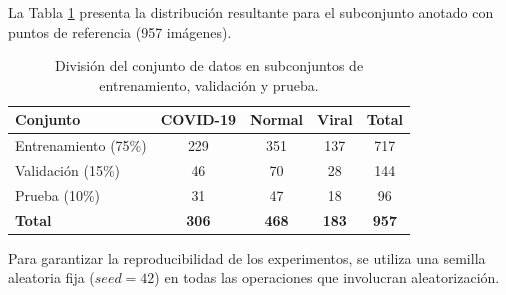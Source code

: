 La Tabla \ref{tab:division_splits} presenta la distribución resultante para el subconjunto anotado con puntos de referencia (957 imágenes).

\begin{table}[htbp]
    \centering
    \caption{División del conjunto de datos en subconjuntos de entrenamiento, validación y prueba.}
    \label{tab:division_splits}
    \small
    \begin{tabular}{@{}lcccc@{}}
        \toprule
        \textbf{Conjunto} & \textbf{COVID-19} & \textbf{Normal} & \textbf{Viral} & \textbf{Total} \\
        \midrule
        Entrenamiento (75\%) & 229 & 351 & 137 & 717 \\
        Validación (15\%) & 46 & 70 & 28 & 144 \\
        Prueba (10\%) & 31 & 47 & 18 & 96 \\
        \midrule
        \textbf{Total} & \textbf{306} & \textbf{468} & \textbf{183} & \textbf{957} \\
        \bottomrule
    \end{tabular}
\end{table}

Para garantizar la reproducibilidad de los experimentos, se utiliza una semilla aleatoria fija ($seed = 42$) en todas las operaciones que involucran aleatorización.
